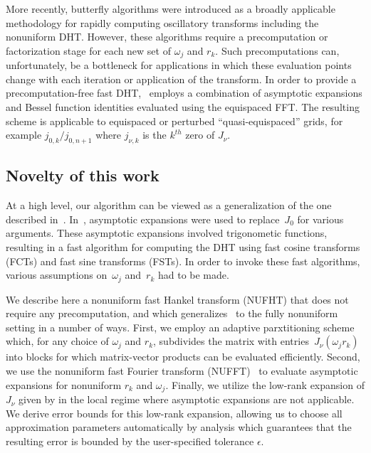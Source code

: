 More recently, butterfly algorithms \cite{oneil2010algorithm, li2015butterfly,
pang2020interpolative} were introduced as a broadly applicable methodology for
rapidly computing oscillatory transforms including the nonuniform DHT. However,
these algorithms require a precomputation or factorization stage for each new
set of $\omega_j$ and $r_k$. Such precomputations can, unfortunately, be a
bottleneck for applications in which these evaluation points change with each
iteration or application of the transform. In order to provide a
precomputation-free fast DHT,~\cite{townsend2015fast} employs a combination of
asymptotic expansions and Bessel function identities evaluated using the
equispaced FFT. The resulting scheme is applicable to equispaced or perturbed
``quasi-equispaced'' grids, for example $j_{0,k} / j_{0,n+1}$ where $j_{\nu,k}$
is the $k^{th}$ zero of $J_\nu$.

\subsection*{Novelty of this work}
\label{sec:novelty}

At a high level, our algorithm can be viewed as a generalization of the one
described in~\cite{townsend2015fast}. In~\cite{townsend2015fast}, asymptotic
expansions were used to replace~$J_0$ for various arguments. These asymptotic
expansions involved trigonometic functions, resulting in a fast algorithm for
computing the DHT using fast cosine transforms (FCTs) and fast sine transforms
(FSTs). In order to invoke these fast algorithms, various assumptions
on~$\omega_j$ and~$r_k$ had to be made.

We describe here a nonuniform fast Hankel transform (NUFHT) that does not
require any precomputation, and which generalizes~\cite{townsend2015fast} to the
fully nonuniform setting in a number of ways. First, we employ an adaptive
parxtitioning scheme which, for any choice of $\omega_j$ and $r_k$, subdivides
the matrix with entries~$J_\nu(\omega_j r_k)$ into blocks for which
matrix-vector products can be evaluated efficiently. Second, we use the
nonuniform fast Fourier transform (NUFFT)~\cite{dutt1993fast,
greengard2004accelerating} to evaluate asymptotic expansions for nonuniform
$r_k$ and $\omega_j$. Finally, we utilize the low-rank expansion of $J_\nu$
given by \cite{wimp1962polynomial} in the local regime where asymptotic
expansions are not applicable. We derive error bounds for this low-rank
expansion, allowing us to choose all approximation parameters automatically by
analysis which guarantees that the resulting error is bounded by the
user-specified tolerance $\epsilon$.


